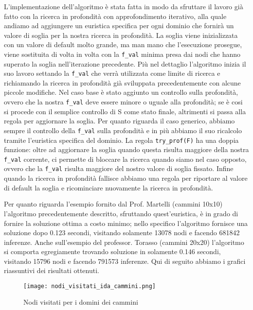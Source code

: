 L'implementazione dell'algoritmo è stata fatta in modo da sfruttare il lavoro già fatto con la ricerca in profondità con approfondimento iterativo, alla quale andiamo ad aggiungere un euristica specifica per ogni dominio che fornirà un valore di soglia per la nostra ricerca in profondità.
La soglia viene inizializzata con un valore di default molto grande, ma man mano che l'esecuzione prosegue, viene sostituita di volta in volta con la \lstinline{f_val} minima presa dai nodi che hanno superato la soglia nell'iterazione precedente.
Più nel dettaglio l'algoritmo inizia il suo lavoro settando la \lstinline{f_val} che verrà utilizzata come limite di ricerca e richiamando la ricerca in profondità già sviluppata precedentemente con alcune piccole modifiche.
Nel caso base è stato aggiunto un controllo sulla profondità, ovvero che la nostra \lstinline{f_val} deve essere minore o uguale alla profondità; se è cosi si procede con il semplice controllo di S come stato finale, altrimenti si passa alla regola per aggiornare la soglia.
Per quanto riguarda il caso generico, abbiamo sempre il controllo della \lstinline{f_val} sulla profondità e in più abbiamo il suo ricalcolo tramite l'euristica specifica del dominio. La regola \lstinline{try_prof(F)} ha una doppia funzione: oltre ad aggiornare la soglia quando questa risulta maggiore della nostra \lstinline{f_val} corrente, ci permette di bloccare la ricerca quando siamo nel caso opposto, ovvero che la \lstinline{f_val} risulta maggiore del nostro valore di soglia fissato. Infine quando la ricerca in profondità fallisce abbiamo una regola per riportare al valore di default la soglia e ricominciare nuovamente la ricerca in profondità.

 Per quanto riguarda l'esempio fornito dal Prof. Martelli (cammini 10x10) l'algoritmo precedentemente descritto, sfruttando quest'euristica, è in grado di fornire la soluzione ottima a costo minimo; nello specifico l'algoritmo fornisce una soluzione dopo 0.123 secondi, visitando solamente 13078 nodi e facendo 681842 inferenze. Anche sull'esempio del professor. Torasso (cammini 20x20) l'algoritmo si comporta egregiamente trovando soluzione in solamente 0.146 secondi, visitando 15796 nodi e facendo 791573 inferenze.
Qui di seguito abbiamo i grafici riassuntivi dei risultati ottenuti.

\begin{figure}[htp]
  \texttt{[image: nodi\_visitati\_ida\_cammini.png]}
  \caption{Nodi visitati per i domini dei cammini}
  \label{fig:figure9}
\end{figure}


